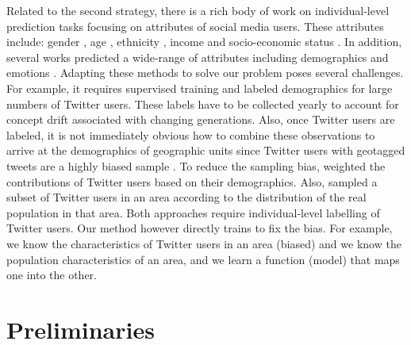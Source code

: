 \documentclass[letterpaper]{article}
\begin{document}
Related to the second strategy, there is a rich body of work on individual-level prediction tasks focusing on attributes of social media users. These attributes include: gender \cite{burger2011discriminating,bergsma2013broadly,bamman2014gender,vicente2015twitter}, age \cite{schwartz2013personality,moseley2014toward}, ethnicity \cite{chang2010epluribus,chen2015comparative}, income and socio-economic status \cite{preoctiuc2015studying,lampos2016inferring}. In addition, several works predicted a wide-range of attributes including demographics and emotions \cite{culotta2015predicting,volkova2015inferring}. Adapting these methods to solve our problem poses several challenges. For example, it requires supervised training and labeled demographics for large numbers of Twitter users. These labels have to be collected yearly to account for concept drift associated with changing generations. Also, once Twitter users are labeled, it is not immediately obvious how to combine these observations to arrive at the demographics of geographic units since Twitter users with geotagged tweets are a highly biased sample \cite{malik2015population}. To reduce the sampling bias, \citeauthor{culotta2014reducing}  weighted the contributions of Twitter users based on their demographics. Also, \citeauthor{almeida2015twitter}  sampled a subset of Twitter users in an area according to the distribution of the real population in that area. Both approaches require individual-level labelling of Twitter users. Our method however directly trains to fix the bias. For example, we know the characteristics of Twitter users in an area (biased) and we know the population characteristics of an area, and we learn a function (model) that maps one into the other. 

\section{Preliminaries}
\end{document}
